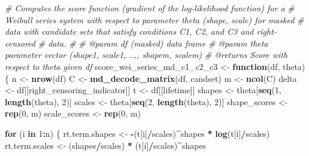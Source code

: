 \documentclass[
]{article}
\newenvironment{Shaded}{\begin{snugshade}}{\end{snugshade}}
\newcommand{\CommentTok}[1]{\textcolor[rgb]{0.56,0.35,0.01}{\textit{#1}}}
\newcommand{\ControlFlowTok}[1]{\textcolor[rgb]{0.13,0.29,0.53}{\textbf{#1}}}
\newcommand{\DecValTok}[1]{\textcolor[rgb]{0.00,0.00,0.81}{#1}}
\newcommand{\KeywordTok}[1]{\textcolor[rgb]{0.13,0.29,0.53}{\textbf{#1}}}
\newcommand{\NormalTok}[1]{#1}
\newcommand{\OperatorTok}[1]{\textcolor[rgb]{0.81,0.36,0.00}{\textbf{#1}}}
\newcommand{\StringTok}[1]{\textcolor[rgb]{0.31,0.60,0.02}{#1}}
\begin{document}
\begin{Shaded}
\begin{Highlighting}[]
\CommentTok{\#\textquotesingle{} Computes the score function (gradient of the log{-}likelihood function) for a}
\CommentTok{\#\textquotesingle{} Weibull series system with respect to parameter \textasciigrave{}theta\textasciigrave{} (shape, scale) for masked}
\CommentTok{\#\textquotesingle{} data with candidate sets that satisfy conditions C1, C2, and C3 and right{-}censored}
\CommentTok{\#\textquotesingle{} data.}
\CommentTok{\#\textquotesingle{}}
\CommentTok{\#\textquotesingle{} @param df (masked) data frame}
\CommentTok{\#\textquotesingle{} @param theta parameter vector (shape1, scale1, ..., shapem, scalem)}
\CommentTok{\#\textquotesingle{} @returns Score with respect to \textasciigrave{}theta\textasciigrave{} given \textasciigrave{}df\textasciigrave{}}
\NormalTok{score\_wei\_series\_md\_c1\_c2\_c3 \textless{}{-}}\StringTok{ }\ControlFlowTok{function}\NormalTok{(df, theta) \{}
\NormalTok{    n \textless{}{-}}\StringTok{ }\KeywordTok{nrow}\NormalTok{(df)}
\NormalTok{    C \textless{}{-}}\StringTok{ }\KeywordTok{md\_decode\_matrix}\NormalTok{(df, candset)}
\NormalTok{    m \textless{}{-}}\StringTok{ }\KeywordTok{ncol}\NormalTok{(C)}
\NormalTok{    delta \textless{}{-}}\StringTok{ }\NormalTok{df[[right\_censoring\_indicator]]}
\NormalTok{    t \textless{}{-}}\StringTok{ }\NormalTok{df[[lifetime]]}
\NormalTok{    shapes \textless{}{-}}\StringTok{ }\NormalTok{theta[}\KeywordTok{seq}\NormalTok{(}\DecValTok{1}\NormalTok{, }\KeywordTok{length}\NormalTok{(theta), }\DecValTok{2}\NormalTok{)]}
\NormalTok{    scales \textless{}{-}}\StringTok{ }\NormalTok{theta[}\KeywordTok{seq}\NormalTok{(}\DecValTok{2}\NormalTok{, }\KeywordTok{length}\NormalTok{(theta), }\DecValTok{2}\NormalTok{)]}
\NormalTok{    shape\_scores \textless{}{-}}\StringTok{ }\KeywordTok{rep}\NormalTok{(}\DecValTok{0}\NormalTok{, m)}
\NormalTok{    scale\_scores \textless{}{-}}\StringTok{ }\KeywordTok{rep}\NormalTok{(}\DecValTok{0}\NormalTok{, m)}

    \ControlFlowTok{for}\NormalTok{ (i }\ControlFlowTok{in} \DecValTok{1}\OperatorTok{:}\NormalTok{n) \{}
\NormalTok{        rt.term.shapes \textless{}{-}}\StringTok{ }\OperatorTok{{-}}\NormalTok{(t[i]}\OperatorTok{/}\NormalTok{scales)}\OperatorTok{\^{}}\NormalTok{shapes }\OperatorTok{*}\StringTok{ }\KeywordTok{log}\NormalTok{(t[i]}\OperatorTok{/}\NormalTok{scales)}
\NormalTok{        rt.term.scales \textless{}{-}}\StringTok{ }\NormalTok{(shapes}\OperatorTok{/}\NormalTok{scales) }\OperatorTok{*}\StringTok{ }\NormalTok{(t[i]}\OperatorTok{/}\NormalTok{scales)}\OperatorTok{\^{}}\NormalTok{shapes}


\end{Highlighting}
\end{Shaded}
\end{document}
